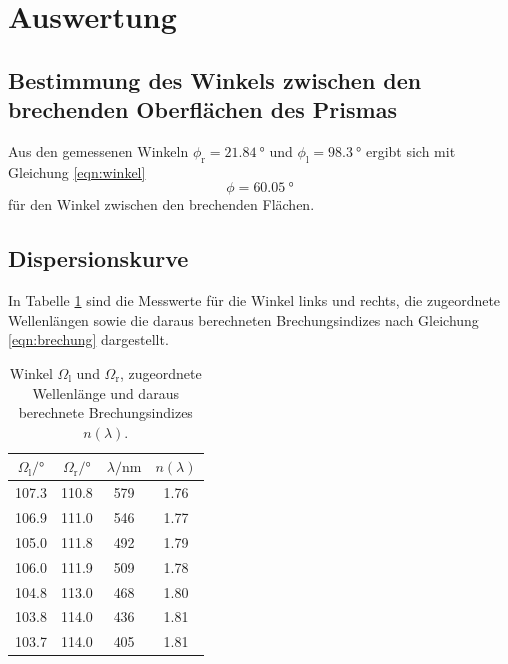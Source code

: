 \section{Auswertung}
\label{sec:Auswertung}
\subsection{Bestimmung des Winkels zwischen den brechenden Oberflächen des Prismas}
Aus den gemessenen Winkeln $\phi_\mathrm{r}=\SI{21.84}{\degree}$ und $\phi_\mathrm{l}=\SI{98.3}{\degree}$ ergibt sich mit Gleichung \ref{eqn:winkel}
\begin{equation}
  \phi=\SI{60.05}{\degree}
\end{equation}
für den Winkel zwischen den brechenden Flächen.

\subsection{Dispersionskurve}

In Tabelle \ref{tab:messwerte} sind die Messwerte für die Winkel links und rechts, die zugeordnete Wellenlängen sowie die daraus berechneten Brechungsindizes nach Gleichung \ref{eqn:brechung} dargestellt.

\begin{table}
  \caption{Winkel $\Omega_\mathrm{l}$ und $\Omega_\mathrm{r}$, zugeordnete Wellenlänge und daraus berechnete Brechungsindizes $n(\lambda)$.}
  \centering
  \label{tab:messwerte}
  \begin{tabular}{c c c c}
  \toprule
   $\Omega_\mathrm{l}/\si{\degree}$ & $\Omega_\mathrm{r}/\si{\degree}$ & $\lambda/\si{\nano\meter}$ & $n(\lambda)$\\
 \midrule
107.3 & 110.8 & 579 & 1.76 \\
106.9 & 111.0 & 546 & 1.77 \\
105.0 & 111.8 & 492 & 1.79 \\
106.0 & 111.9 & 509 & 1.78 \\
104.8 & 113.0 & 468 & 1.80 \\
103.8 & 114.0 & 436 & 1.81 \\
103.7 & 114.0 & 405 & 1.81 \\
\bottomrule
\end{tabular}
\end{table}

